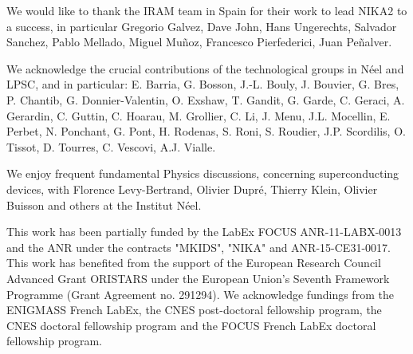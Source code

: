 \documentclass[]{aa} %
\begin{document}
\begin{acknowledgements}
We would like to thank the IRAM team in Spain for their work to lead NIKA2 to a success, in particular Gregorio Galvez, Dave John, Hans Ungerechts, Salvador Sanchez, Pablo Mellado, Miguel Mu\~noz, Francesco Pierfederici, Juan Pe\~nalver.

We acknowledge the crucial contributions of the technological groups in N\'eel and LPSC, and in particular: E. Barria, G. Bosson, J.-L. Bouly, J. Bouvier, G. Bres, P. Chantib, G. Donnier-Valentin,  O. Exshaw, T. Gandit, G. Garde, C. Geraci, A. Gerardin, C. Guttin, C. Hoarau, M. Grollier, C. Li, J. Menu, J.L. Mocellin, E. Perbet, N. Ponchant, G. Pont, H. Rodenas, S. Roni, S. Roudier, J.P. Scordilis, O. Tissot, D. Tourres, C. Vescovi, A.J. Vialle. 

We enjoy frequent fundamental Physics discussions, concerning superconducting devices, with Florence Levy-Bertrand, Olivier Dupr\'e, Thierry Klein, Olivier Buisson and others at the Institut N\'eel.

This work has been partially funded by the LabEx FOCUS ANR-11-LABX-0013 and 
the ANR under the contracts "MKIDS", "NIKA" and ANR-15-CE31-0017. 
This work has benefited from the support of the European Research Council Advanced Grant ORISTARS under the European Union's Seventh Framework Programme (Grant Agreement no. 291294). We acknowledge fundings from the ENIGMASS French LabEx, 
the CNES post-doctoral fellowship program,  the CNES doctoral fellowship program and the FOCUS French LabEx doctoral fellowship program.


\end{acknowledgements}


%
%


%
% 
\end{document}
